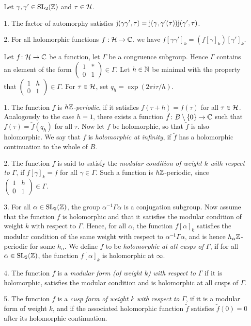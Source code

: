\begin{remark}
 Let $\gamma,\gamma'\in\operatorname{SL}_2(\mathbb{Z})$ and $\tau\in\mathcal{H}$.
 
 1. The factor of automorphy satisfies $\mathrm{j}(\gamma\gamma',\tau) = \mathrm{j}(\gamma,\gamma'(\tau))\mathrm{j}(\gamma',\tau)$.
 
 2. For all holomorphic functions $f:\mathcal{H}\to\mathbb{C}$, we have $f[\gamma\gamma']_k=(f[\gamma]_k)[\gamma']_k$.
\end{remark}

\begin{defi} Let $f\colon \mathcal{H} \to \mathbb{C}$ be a function, let $\Gamma$ be a congruence subgroup. Hence $\Gamma$ contains an element of the form $\left(\begin{smallmatrix}1 & *\\0 & 1\end{smallmatrix}\right)\in\Gamma$. Let $h\in\mathbb{N}$ be minimal with the property that $\left(\begin{smallmatrix}1 & h\\0 & 1\end{smallmatrix}\right)\in\Gamma$. For $\tau\in\mathcal{H}$, set $q_h=\exp(2\pi i\tau/h)$.

  1. The function $f$ is \emph{$h\mathbb{Z}$-periodic}, if it satisfies $f(\tau + h) = f(\tau)$ for all $\tau \in \mathcal{H}$. Analogously to the case $h=1$, there exists a function $\tilde f\colon B\setminus \{0\} \to \mathbb{C}$ such that $f(\tau)=\tilde f(q_h)$ for all $\tau$. Now let $f$ be holomorphic, so that $\tilde f$ is also holomorphic. We say that $f$ is \emph{holomorphic at infinity}, if $\tilde f$ has a holomorphic continuation to the whole of $B$.
  
  2. The function $f$ is said to satisfy the \emph{modular condition of weight $k$ with respect to $\Gamma$}, if $f[\gamma]_k=f$ for all $\gamma \in \Gamma$. Such a function is $h\mathbb{Z}$-periodic, since $\left(\begin{smallmatrix}1 & h\\0 & 1\end{smallmatrix}\right)\in\Gamma$.
  
  3. For all $\alpha\in\operatorname{SL}_2(\mathbb{Z})$, the group $\alpha^{-1}\Gamma\alpha$ is a conjugation subgroup. Now assume that the function $f$ is holomorphic and that it satisfies the modular condition of weight $k$ with respect to $\Gamma$. Hence, for all $\alpha$, the function $f[\alpha]_k$ satisfies the modular condition of the same weight with respect to $\alpha^{-1}\Gamma\alpha$, and is hence $h_\alpha\mathbb{Z}$-periodic for some $h_\alpha$. We define $f$ to be \emph{holomorphic at all cusps of $\Gamma$}, if for all $\alpha\in\operatorname{SL}_2(\mathbb{Z})$, the function $f[\alpha]_k$ is holomorphic at $\infty$.
  
  4. The function $f$ is a \emph{modular form (of weight $k$) with respect to $\Gamma$} if it is holomorphic, satisfies the modular condition and is holomorphic at all cusps of $\Gamma$.
  
  5. The function $f$ is a \emph{cusp form of weight $k$ with respect to $\Gamma$}, if it is a modular form of weight $k$, and if the associated holomorphic function $\tilde{f}$ satisfies $\tilde{f}(0)=0$ after its holomorphic continuation. 
\end{defi}

